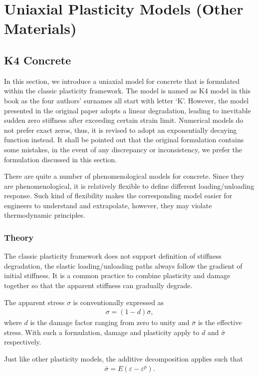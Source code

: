 \chapter{Uniaxial Plasticity Models (Other Materials)}
\section{K4 Concrete}
In this section, we introduce a uniaxial model for concrete that is formulated within the classic plasticity framework. The model is named as K4 model in this book as the four authors' surnames all start with letter `K'. However, the model presented in the original paper adopts a linear degradation, leading to inevitable sudden zero stiffness after exceeding certain strain limit. Numerical models do not prefer exact zeros, thus, it is revised to adopt an exponentially decaying function instead. It shall be pointed out that the original formulation \cite{Kenawy2020} contains some mistakes, in the event of any discrepancy or inconsistency, we prefer the formulation discussed in this section.

There are quite a number of phenomenological models for concrete. Since they are phenomenological, it is relatively flexible to define different loading/unloading response. Such kind of flexibility makes the corresponding model easier for engineers to understand and extrapolate, however, they may violate thermodynamic principles.
\subsection{Theory}
The classic plasticity framework does not support definition of stiffness degradation, the elastic loading/unloading paths always follow the gradient of initial stiffness. It is a common practice to combine plasticity and damage \cite{Lemaitre1985} together so that the apparent stiffness can gradually degrade.

The apparent stress $\sigma$ is conventionally expressed as
\begin{gather}
\sigma=\left(1-d\right)\bar{\sigma},
\end{gather}
where $d$ is the damage factor ranging from zero to unity and $\bar{\sigma}$ is the effective stress. With such a formulation, damage and plasticity apply to $d$ and $\bar{\sigma}$ respectively.

Just like other plasticity models, the additive decomposition applies such that
\begin{gather}
\bar{\sigma}=E\left(\varepsilon-\varepsilon^p\right).
\end{gather}
